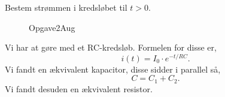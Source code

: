 
\title{\vspace{-1cm}\vspace{-1cm}}
\author{}
\date{}


\maketitle
\thispagestyle{fancy}
\begin{exercise}
\end{exercise}
\begin{subexercise}[a]
Bestem strømmen i kredsløbet til $t>0$.
\end{subexercise}
\begin{figure}[ht]
    \centering
    \caption{Opgave2Aug}
    \label{fig:opgave2aug}
\end{figure}
\begin{solution}
Vi har at gøre med et RC-kredsløb. Formelen for disse er,
\[
	i(t) = I_0\cdot e^{-t / RC}
.\]
Vi fandt en ækvivalent kapacitor, disse sidder i parallel så,
\[
C = C_1 + C_2
.\] 
Vi fandt desuden en ækvivalent resistor.
\end{solution}\\

